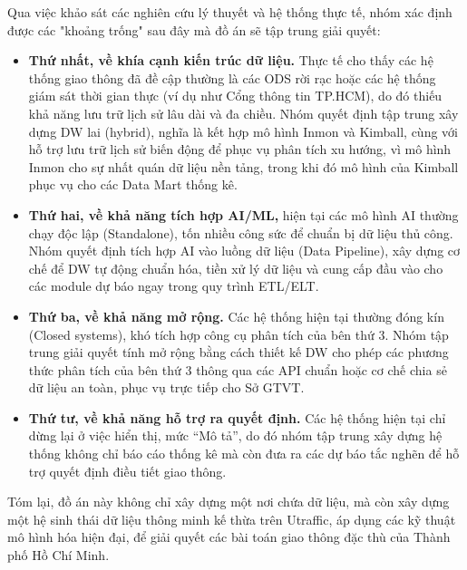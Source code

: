 Qua việc khảo sát các nghiên cứu lý thuyết và hệ thống thực tế, nhóm xác định được các "khoảng trống" sau đây mà đồ án sẽ tập trung giải quyết:

\begin{itemize}
    \item \textbf{Thứ nhất, về khía cạnh kiến trúc dữ liệu.} Thực tế cho thấy các hệ thống giao thông đã đề cập thường là các ODS rời rạc hoặc các hệ thống giám sát thời gian thực (ví dụ như Cổng thông tin TP.HCM), do đó thiếu khả năng lưu trữ lịch sử lâu dài và đa chiều. Nhóm quyết định tập trung xây dựng DW lai (hybrid), nghĩa là kết hợp mô hình Inmon và Kimball, cùng với hỗ trợ lưu trữ lịch sử biến động để phục vụ phân tích xu hướng, vì mô hình Inmon cho sự nhất quán dữ liệu nền tảng, trong khi đó mô hình của Kimball phục vụ cho các Data Mart thống kê.
    
    \item \textbf{Thứ hai, về khả năng tích hợp AI/ML,} hiện tại các mô hình AI thường chạy độc lập (Standalone), tốn nhiều công sức để chuẩn bị dữ liệu thủ công. Nhóm quyết định tích hợp AI vào luồng dữ liệu (Data Pipeline), xây dựng cơ chế để DW tự động chuẩn hóa, tiền xử lý dữ liệu và cung cấp đầu vào cho các module dự báo ngay trong quy trình ETL/ELT.
    
    \item \textbf{Thứ ba, về khả năng mở rộng.} Các hệ thống hiện tại thường đóng kín (Closed systems), khó tích hợp công cụ phân tích của bên thứ 3. Nhóm tập trung giải quyết tính mở rộng bằng cách thiết kế DW cho phép các phương thức phân tích của bên thứ 3 thông qua các API chuẩn hoặc cơ chế chia sẻ dữ liệu an toàn, phục vụ trực tiếp cho Sở GTVT.
    
    \item \textbf{Thứ tư, về khả năng hỗ trợ ra quyết định.} Các hệ thống hiện tại chỉ dừng lại ở việc hiển thị, mức “Mô tả”, do đó nhóm tập trung xây dựng hệ thống không chỉ báo cáo thống kê mà còn đưa ra các dự báo tắc nghẽn để hỗ trợ quyết định điều tiết giao thông.
\end{itemize}

Tóm lại, đồ án này không chỉ xây dựng một nơi chứa dữ liệu, mà còn xây dựng một hệ sinh thái dữ liệu thông minh kế thừa trên Utraffic, áp dụng các kỹ thuật mô hình hóa hiện đại, để giải quyết các bài toán giao thông đặc thù của Thành phố Hồ Chí Minh.
